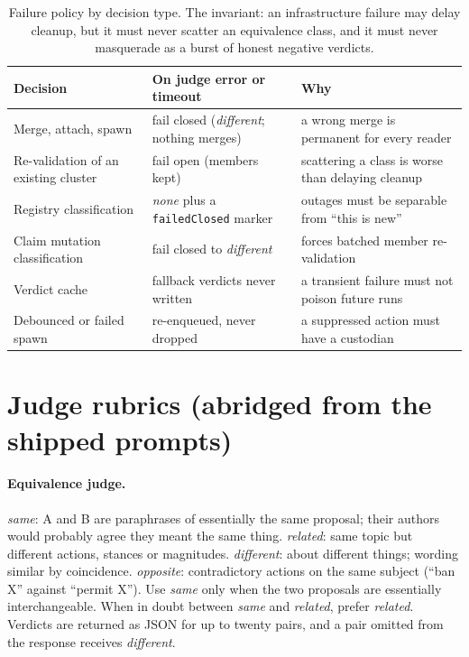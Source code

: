\documentclass{article}
\begin{document}
\begin{table}[h]
\centering\scriptsize
\caption{Failure policy by decision type. The invariant: an infrastructure failure may delay cleanup, but it must never scatter an equivalence class, and it must never masquerade as a burst of honest negative verdicts.}
\begin{tabular}{lll}
\toprule
Decision & On judge error or timeout & Why \\
\midrule
Merge, attach, spawn & fail closed (\emph{different}; nothing merges) & a wrong merge is permanent for every reader \\
Re-validation of an existing cluster & fail open (members kept) & scattering a class is worse than delaying cleanup \\
Registry classification & \emph{none} plus a \texttt{failedClosed} marker & outages must be separable from ``this is new'' \\
Claim mutation classification & fail closed to \emph{different} & forces batched member re-validation \\
Verdict cache & fallback verdicts never written & a transient failure must not poison future runs \\
Debounced or failed spawn & re-enqueued, never dropped & a suppressed action must have a custodian \\
\bottomrule
\end{tabular}
\end{table}

\section{Judge rubrics (abridged from the shipped prompts)}
\label{app:prompts}
\paragraph{Equivalence judge.} \emph{same}: A and B are paraphrases of essentially the same proposal; their authors would probably agree they meant the same thing. \emph{related}: same topic but different actions, stances or magnitudes. \emph{different}: about different things; wording similar by coincidence. \emph{opposite}: contradictory actions on the same subject (``ban X'' against ``permit X''). Use \emph{same} only when the two proposals are essentially interchangeable. When in doubt between \emph{same} and \emph{related}, prefer \emph{related}. Verdicts are returned as JSON for up to twenty pairs, and a pair omitted from the response receives \emph{different}.
\end{document}
